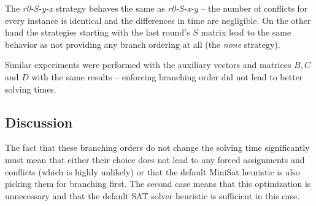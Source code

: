 The \emph{r0-S-y-x} strategy behaves the same as \emph{r0-S-x-y} -- the number of conflicts for every instance is identical and the differences in time are negligible.
On the other hand the strategies starting with the last round's $S$ matrix lead to the same behavior as not providing any branch ordering at all (the \emph{none} strategy).

Similar experiments were performed with the auxiliary vectors and matrices $B, C$ and $D$ with the same results -- enforcing branching order did not lead to better solving times.

\subsection{Discussion}

The fact that these branching orders do not change the solving time significantly must mean that either their choice does not lead to any forced assignments and conflicts (which is highly unlikely) or that the default MiniSat heuristic is also picking them for branching first.
The second case means that this optimization is unnecessary and that the default SAT solver heuristic is sufficient in this case.